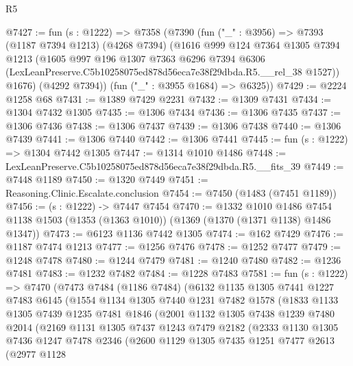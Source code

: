 \begin{lexlean}{R5}
\begin{coremodule}
@7427 := fun (s : @1222) =>
  @7358
    (@7390
      (fun ("_" : @3956) =>
      @7393
        (@1187 @7394 @1213)
        (@4268 @7394)
        (@1616
          @999
          @124
          @7364
          @1305
          @7394
          @1213
          (@1605
            @997
            @196
            @1307
            @7363
            @6296
            @7394
            @6306
            (LexLeanPreserve.C5b10258075ed878d56eca7e38f29dbda.R5.__rel_38 @1527))
          @1676)
        (@4292 @7394))
      (fun ("_" : @3955 @1684) => @6325))
@7429 := @2224 @1258 @68
@7431 := @1389 @7429 @2231
@7432 := @1309 @7431
@7434 := @1304 @7432 @1305
@7435 := @1306 @7434
@7436 := @1306 @7435
@7437 := @1306 @7436
@7438 := @1306 @7437
@7439 := @1306 @7438
@7440 := @1306 @7439
@7441 := @1306 @7440
@7442 := @1306 @7441
@7445 := fun (s : @1222) => @1304 @7442 @1305
@7447 := @1314 @1010 @1486
@7448 := LexLeanPreserve.C5b10258075ed878d56eca7e38f29dbda.R5.__fits_39
@7449 := @7448 @1189
@7450 := @1320 @7449
@7451 := Reasoning.Clinic.Escalate.conclusion
@7454 := @7450 (@1483 (@7451 @1189))
@7456 := (s : @1222) -> @7447 @7454
@7470 := @1332
    @1010
    @1486
    @7454
    @1138
    @1503
    (@1353 (@1363 @1010))
    (@1369 (@1370 (@1371 @1138) @1486 @1347))
@7473 := @6123 @1136 @7442 @1305
@7474 := @162 @7429
@7476 := @1187 @7474 @1213
@7477 := @1256 @7476
@7478 := @1252 @7477
@7479 := @1248 @7478
@7480 := @1244 @7479
@7481 := @1240 @7480
@7482 := @1236 @7481
@7483 := @1232 @7482
@7484 := @1228 @7483
@7581 := fun (s : @1222) =>
  @7470
    (@7473
      @7484
      (@1186 @7484)
      (@6132
        @1135
        @1305
        @7441
        @1227
        @7483
        @6145
        (@1554
          @1134
          @1305
          @7440
          @1231
          @7482
          @1578
          (@1833
            @1133
            @1305
            @7439
            @1235
            @7481
            @1846
            (@2001
              @1132
              @1305
              @7438
              @1239
              @7480
              @2014
              (@2169
                @1131
                @1305
                @7437
                @1243
                @7479
                @2182
                (@2333
                  @1130
                  @1305
                  @7436
                  @1247
                  @7478
                  @2346
                  (@2600
                    @1129
                    @1305
                    @7435
                    @1251
                    @7477
                    @2613
                    (@2977
                      @1128

\end{coremodule}
\end{lexlean}
